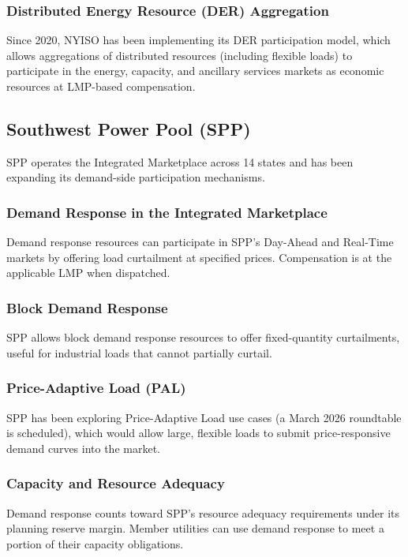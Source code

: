 \documentclass[12pt]{article}
\begin{document}
\subsubsection{Distributed Energy Resource (DER) Aggregation}
Since 2020, NYISO has been implementing its DER participation model, which allows aggregations of distributed resources (including flexible loads) to participate in the energy, capacity, and ancillary services markets as economic resources at LMP-based compensation.

\subsection{Southwest Power Pool (SPP)}

SPP operates the Integrated Marketplace across 14 states and has been expanding its demand-side participation mechanisms.

\subsubsection{Demand Response in the Integrated Marketplace}
Demand response resources can participate in SPP's Day-Ahead and Real-Time markets by offering load curtailment at specified prices. Compensation is at the applicable LMP when dispatched.

\subsubsection{Block Demand Response}
SPP allows block demand response resources to offer fixed-quantity curtailments, useful for industrial loads that cannot partially curtail.

\subsubsection{Price-Adaptive Load (PAL)}
SPP has been exploring Price-Adaptive Load use cases (a March 2026 roundtable is scheduled), which would allow large, flexible loads to submit price-responsive demand curves into the market.

\subsubsection{Capacity and Resource Adequacy}
Demand response counts toward SPP's resource adequacy requirements under its planning reserve margin. Member utilities can use demand response to meet a portion of their capacity obligations.
\end{document}
